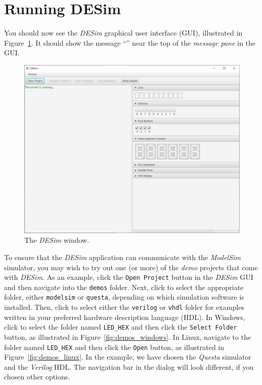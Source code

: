 \documentclass[11pt, twoside, pdftex]{article}
\begin{document}
\newpage
\section{Running DESim}

You should now see the {\it DESim} graphical user interface (GUI),
illustrated in Figure~\ref{fig:GUI}. It should show the message
``'' near the top of the {\it message pane} in the GUI.

\begin{figure}[h]
	\begin{center}
		\includegraphics[width = \textwidth]{figures/DESim_GUI.png}
	\end{center}
          \caption{The {\it DESim} window.}
	\label{fig:GUI}
\end{figure}


To ensure that the {\it DESim} application can communicate with the {\it ModelSim} simulator, you
may wish to try out one (or more) of the {\it demo} projects that come with {\it DESim}. As
an example, click the \texttt{Open Project} button in the {\it DESim} GUI and then navigate into
the \texttt{demos} folder. Next, click to select the appropriate folder, either \texttt{modelsim} 
or \texttt{questa}, depending on which simulation software is installed. Then, click to select 
either the \texttt{verilog} or \texttt{vhdl} folder for examples written in your preferred 
hardware description language (HDL). In Windows, click to select the folder named \texttt{LED\_HEX} 
and then click the \texttt{Select Folder} button, as illustrated in Figure~\ref{fig:demos_windows}.
In Linux, navigate to the folder named \texttt{LED\_HEX} and then click the
\texttt{Open} button, as illustrated in Figure~\ref{fig:demos_linux}.
In the example, we have chosen the {\it Questa} simulator and the {\it Verilog} HDL. 
The navigation bar in the dialog will look different, if you chosen other options.
\end{document}
